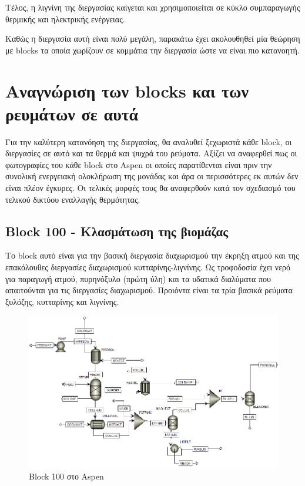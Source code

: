 \documentclass[11pt]{article}
\begin{document}
Τέλος, η λιγνίνη της διεργασίας καίγεται και χρησιμοποιείται σε κύκλο συμπαραγωγής θερμικής και ηλεκτρικής ενέργειας.

Καθώς η διεργασία αυτή είναι πολύ μεγάλη, παρακάτω έχει ακολουθηθεί μία θεώρηση με blocks τα οποία χωρίζουν σε κομμάτια την διεργασία ώστε να είναι πιο κατανοητή.

\section{Αναγνώριση των blocks και των ρευμάτων σε αυτά}
\label{sec:org36c8c7a}
Για την καλύτερη κατανόηση της διεργασίας, θα αναλυθεί ξεχωριστά κάθε block, οι διεργασίες σε αυτό και τα θερμά και ψυχρά του ρεύματα. Αξίζει να αναφερθεί πως οι φωτογραφίες του κάθε block στο Aspen οι οποίες παρατίθενται είναι πριν την συνολική ενεργειακή ολοκλήρωση της μονάδας και άρα οι περισσότερες εκ αυτών δεν είναι πλέον έγκυρες. Οι τελικές μορφές τους θα αναφερθούν κατά τον σχεδιασμό του τελικού δικτύου εναλλαγής θερμότητας.

\subsection{Block 100 - Κλασμάτωση της βιομάζας}
\label{sec:org47f818d}
Το block αυτό είναι για την βασική διεργασία διαχωρισμού την έκρηξη ατμού και της επακόλουθες διεργασίες διαχωρισμού κυτταρίνης-λιγνίνης. Ως τροφοδοσία έχει νερό για παραγωγή ατμού, πυρηνόξυλο (πρώτη ύλη) και τα υδατικά διαλύματα που απαιτούνται για τις διεργασίες διαχωρισμού. Προιόντα είναι τα τρία βασικά ρεύματα ξυλόζης, κυτταρίνης και λιγνίνης.

\begin{figure}[htbp]
\centering
\includegraphics[width=.9\linewidth]{Block_100_-_Διαχωρισμός_των_τριών_κομματιών_της_βιομάζας/2023-03-11_15-21-38_screenshot.png}
\caption{Block 100 στο Aspen}
\end{figure}
\end{document}
